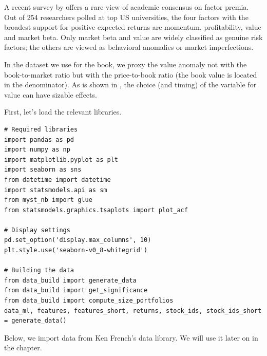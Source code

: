 A recent survey by \cite{welch2026assessing} offers a rare view of academic consensus on factor premia. Out of 254 researchers polled at top US universities, the four factors with the broadest support for positive expected returns are momentum, profitability, value and market beta. Only market beta and value are widely classified as genuine risk factors; the others are viewed as behavioral anomalies or market imperfections.

In the dataset we use for the book, we proxy the value anomaly not with the book-to-market ratio but with the price-to-book ratio (the book value is located in the denominator). As is shown in \cite{asness2013devil}, the choice (and timing) of the variable for value can have sizable effects.

First, let's load the relevant libraries.

\begin{verbatim}
# Required libraries
import pandas as pd
import numpy as np
import matplotlib.pyplot as plt
import seaborn as sns
from datetime import datetime
import statsmodels.api as sm
from myst_nb import glue
from statsmodels.graphics.tsaplots import plot_acf

# Display settings
pd.set_option('display.max_columns', 10)
plt.style.use('seaborn-v0_8-whitegrid')

# Building the data
from data_build import generate_data
from data_build import get_significance
from data_build import compute_size_portfolios
data_ml, features, features_short, returns, stock_ids, stock_ids_short = generate_data()
\end{verbatim}

Below, we import data from Ken French's data library. We will use it later on in the chapter.

